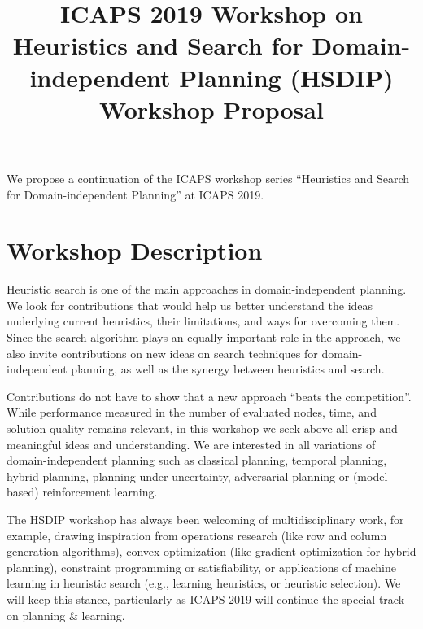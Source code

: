 \documentclass[10pt]{article}
\begin{document}
\title{ICAPS 2019 Workshop on \\ Heuristics and Search for Domain-independent
Planning (HSDIP)\\ \vspace*{0.7cm} Workshop Proposal
}
\date{}

\author{}

\maketitle

\vspace{-0.5cm}


We propose a continuation of the ICAPS workshop series ``Heuristics
and Search for Domain-independent Planning'' at ICAPS 2019.

\section*{Workshop Description}
Heuristic search is one of the main approaches in domain-independent
planning.  We look for contributions that would help us better
understand the ideas underlying current heuristics, their limitations,
and ways for overcoming them.
%
Since the search algorithm plays an equally important role in the
approach, we also invite contributions on new ideas on search
techniques for domain-independent planning, as well as the synergy
between heuristics and search.

Contributions do not have to show that a new approach ``beats the competition''.
While performance measured in the number of evaluated nodes, time, and solution
quality remains relevant, in this workshop we seek above all crisp and
meaningful ideas and understanding.
%
We are interested in all variations of domain-independent planning
such as classical planning, temporal planning, hybrid planning, planning under
uncertainty, adversarial planning or (model-based) reinforcement learning.

The HSDIP workshop has always been welcoming of multidisciplinary work,
for example, drawing inspiration from operations research (like row and
column generation algorithms), convex optimization (like gradient
optimization for hybrid planning), constraint programming or
satisfiability, or applications of machine learning in heuristic search
(e.g., learning heuristics, or heuristic selection). We will keep this
stance, particularly as ICAPS 2019 will continue the special track on
planning \& learning.
\end{document}
